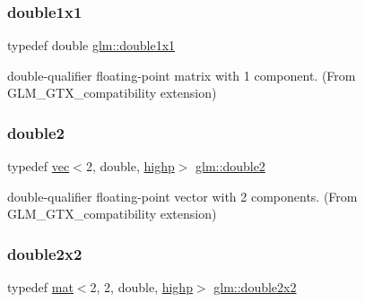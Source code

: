 \mbox{\label{group__gtx__compatibility_ga1c87d3042377335eb050a20ab0ec148a}} 
\subsubsection{\texorpdfstring{double1x1}{double1x1}}
{\footnotesize\ttfamily typedef double \hyperlink{group__gtx__compatibility_ga1c87d3042377335eb050a20ab0ec148a}{glm\+::double1x1}}



double-\/qualifier floating-\/point matrix with 1 component. (From G\+L\+M\+\_\+\+G\+T\+X\+\_\+compatibility extension) 

\mbox{\label{group__gtx__compatibility_gaadf812a4d848bf77684844269e1d44eb}} 
\subsubsection{\texorpdfstring{double2}{double2}}
{\footnotesize\ttfamily typedef \hyperlink{structglm_1_1vec}{vec}$<$2, double, \hyperlink{namespaceglm_a36ed105b07c7746804d7fdc7cc90ff25ac6f7eab42eacbb10d59a58e95e362074}{highp}$>$ \hyperlink{group__gtx__compatibility_gaadf812a4d848bf77684844269e1d44eb}{glm\+::double2}}



double-\/qualifier floating-\/point vector with 2 components. (From G\+L\+M\+\_\+\+G\+T\+X\+\_\+compatibility extension) 

\mbox{\label{group__gtx__compatibility_ga38235425d2401904456ecbc342d87453}} 
\subsubsection{\texorpdfstring{double2x2}{double2x2}}
{\footnotesize\ttfamily typedef \hyperlink{structglm_1_1mat}{mat}$<$2, 2, double, \hyperlink{namespaceglm_a36ed105b07c7746804d7fdc7cc90ff25ac6f7eab42eacbb10d59a58e95e362074}{highp}$>$ \hyperlink{group__gtx__compatibility_ga38235425d2401904456ecbc342d87453}{glm\+::double2x2}}



